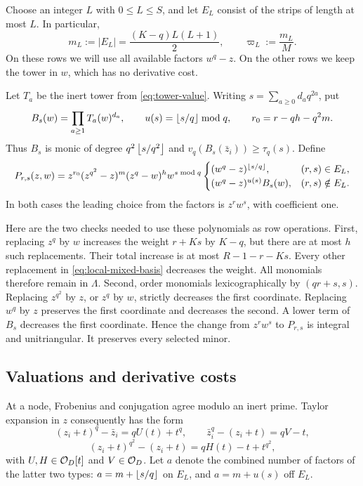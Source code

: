 Choose an integer $L$ with $0\leq L\leq S$, and let $E_L$ consist of the
strips of length at most $L$. In particular,
\begin{equation}\label{eq:local-cut-size}
 m_L:=|E_L|=\frac{(K-q)L(L+1)}2,\qquad \varpi_L:=\frac{m_L}{M}.
\end{equation}
On these rows we
will use all available factors $w^q-z$. On the other rows we keep the tower
in $w$, which has no derivative cost.

Let $T_a$ be the inert tower from \eqref{eq:tower-value}. Writing
$s=\sum_{a\geq0}d_aq^{2a}$, put
\[
 B_s(w)=\prod_{a\geq1}T_a(w)^{d_a},\qquad
 u(s)=\left\lfloor s/q\right\rfloor\bmod q,\qquad r_0=r-qh-q^2m.
\]
Thus $B_s$ is monic of degree $q^2\left\lfloor s/q^2\right\rfloor$ and
$v_q(B_s(\bar z_i))\geq\tau_q(s)$. Define
\begin{equation}\label{eq:local-mixed-basis}
 P_{r,s}(z,w)=z^{r_0}(z^{q^2}-z)^m(z^q-w)^h w^{s\bmod q}
 \begin{cases}
 (w^q-z)^{\left\lfloor s/q\right\rfloor},&(r,s)\in E_L,\\
 (w^q-z)^{u(s)}B_s(w),&(r,s)\notin E_L.
 \end{cases}
\end{equation}
In both cases the leading choice from the factors is $z^rw^s$, with
coefficient one.

Here are the two checks needed to use these polynomials as row operations.
First, replacing $z^q$ by $w$ increases the weight $r+Ks$ by $K-q$, but
there are at most $h$ such replacements. Their total increase is at most
$R-1-r-Ks$. Every other replacement in
\eqref{eq:local-mixed-basis} decreases the weight. All monomials therefore
remain in $\Lambda$. Second, order monomials lexicographically by
$(qr+s,s)$. Replacing $z^{q^2}$ by $z$, or $z^q$ by $w$, strictly decreases
the first coordinate. Replacing $w^q$ by $z$ preserves the first coordinate
and decreases the second. A lower term of $B_s$ decreases the first
coordinate. Hence the change from $z^rw^s$ to $P_{r,s}$ is integral and
unitriangular. It preserves every selected minor.

\subsection{Valuations and derivative costs}
At a node, Frobenius and conjugation agree modulo an inert prime. Taylor
expansion in $z$ consequently has the form
\[
 (z_i+t)^q-\bar z_i=qU(t)+t^q,\qquad
 \bar z_i^q-(z_i+t)=qV-t,
\]
\[
 (z_i+t)^{q^2}-(z_i+t)=qH(t)-t+t^{q^2},
\]
with $U,H\in\mathcal O_D[t]$ and $V\in\mathcal O_D$. Let $a$ denote the combined number
of factors of the latter two types: $a=m+\left\lfloor s/q\right\rfloor$ on $E_L$, and
$a=m+u(s)$ off $E_L$.

